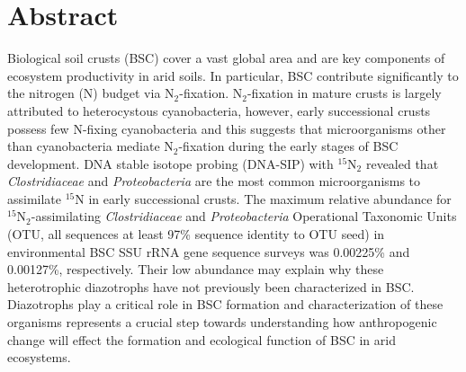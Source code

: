 \section{Abstract}
Biological soil crusts (BSC) cover a vast global area and are key components of
ecosystem productivity in arid soils. In particular, BSC contribute
significantly to the nitrogen (N) budget via N$_{2}$-fixation.
N$_{2}$-fixation in mature crusts is largely attributed to heterocystous
cyanobacteria, however, early successional crusts possess few N-fixing
cyanobacteria and this suggests that microorganisms other than cyanobacteria
mediate N$_{2}$-fixation during the early stages of BSC development. DNA stable
isotope probing (DNA-SIP) with $^{15}$N$_{2}$ revealed that
\textit{Clostridiaceae} and \textit{Proteobacteria} are the most common
microorganisms to assimilate $^{15}$N in early successional crusts.  The
maximum relative abundance for $^{15}$N$_{2}$-assimilating
\textit{Clostridiaceae} and \textit{Proteobacteria} Operational Taxonomic Units
(OTU, all sequences at least 97\% sequence identity to OTU seed) in
environmental BSC SSU rRNA gene sequence surveys was 0.00225\% and 0.00127\%,
respectively. Their low abundance may explain why these heterotrophic
diazotrophs have not previously been characterized in BSC.  Diazotrophs play a
critical role in BSC formation and characterization of these organisms
represents a crucial step towards understanding how anthropogenic change will
effect the formation and ecological function of BSC in arid ecosystems.


